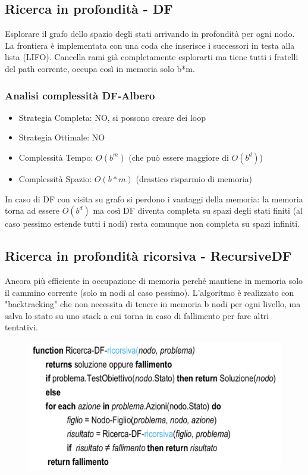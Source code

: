\documentclass{article}
\begin{document}
\subsection{Ricerca in profondità - DF}
Esplorare il grafo dello spazio degli stati arrivando in profondità per ogni nodo. La frontiera è implementata con una coda che inserisce i successori in testa alla lista (LIFO). Cancella rami già completamente esplorarti ma tiene tutti i fratelli del path corrente, occupa così in memoria solo b*m.

\subsubsection{Analisi complessità DF-Albero}
\begin{itemize}
    \item Strategia Completa: NO, si possono creare dei loop
    \item Strategia Ottimale: NO
    \item Complessità Tempo: $O(b^m)$ (che può essere maggiore di $O(b^d)$)
    \item Complessità Spazio: $O(b*m)$ (drastico risparmio di memoria)
\end{itemize}
In caso di DF con visita su grafo si perdono i vantaggi della memoria: la memoria torna ad essere $O(b^d)$ ma così DF diventa completa su spazi degli stati finiti (al caso pessimo estende tutti i nodi) resta comunque non completa su spazi infiniti.

\subsection{Ricerca in profondità ricorsiva - RecursiveDF}
Ancora più efficiente in occupazione di memoria perché mantiene in memoria solo il cammino corrente (solo m nodi al caso pessimo). L'algoritmo è realizzato con "backtracking" che non necessita di tenere in memoria b nodi per ogni livello, ma salva lo stato su uno stack a cui torna in caso di fallimento per fare altri tentativi.
\begin{figure}[H]
    \centering
    \includegraphics[scale=0.5]{Images/DFR.png}
\end{figure}
\end{document}
